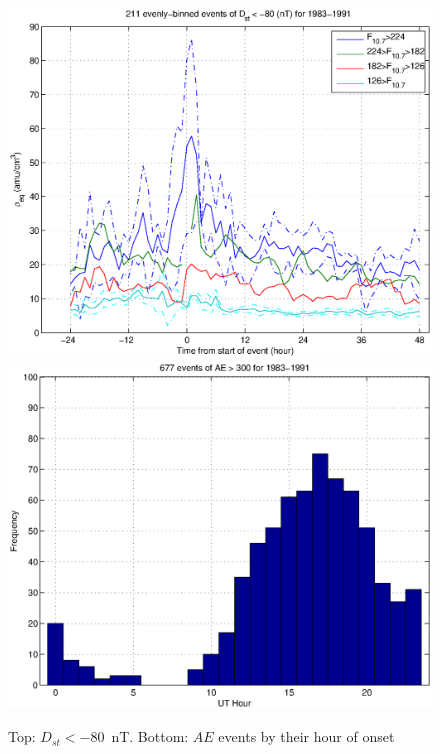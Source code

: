 \documentclass[10pt,twocolumn]{article}
\begin{document}
\begin{figure}[htp!]
\includegraphics[scale=0.45]{paperfigures/HighLowF107rhoeq-Dst80.eps}
\includegraphics[scale=0.45]{paperfigures/AEbyhour.eps}
\caption{Top: $D_{st}<-80$~nT. Bottom: $AE$ events by their hour of onset}
\end{figure}
\clearpage
\end{document}
